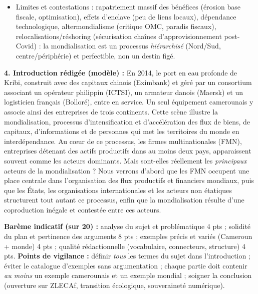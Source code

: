 \documentclass[11pt]{article}
\begin{document}
\begin{corrige}
\begin{itemize}
\begin{itemize}
        \item[b)] Limites et contestations : rapatriement massif des bénéfices (érosion base fiscale, optimisation), effets d'enclave (peu de liens locaux), dépendance technologique, altermondialisme (critique OMC, paradis fiscaux), relocalisations/réshoring (sécurisation chaînes d'approvisionnement post-Covid) : la mondialisation est un processus \emph{hiérarchisé} (Nord/Sud, centre/périphérie) et perfectible, non un destin figé.
    \end{itemize}
\end{itemize}

\textbf{4. Introduction rédigée (modèle) :}
\og En 2014, le port en eau profonde de Kribi, construit avec des capitaux chinois (Eximbank) et géré par un consortium associant un opérateur philippin (ICTSI), un armateur danois (Maersk) et un logisticien français (Bolloré), entre en service. Un seul équipement camerounais y associe ainsi des entreprises de trois continents. Cette scène illustre la mondialisation, processus d'intensification et d'accélération des flux de biens, de capitaux, d'informations et de personnes qui met les territoires du monde en interdépendance. Au cœur de ce processus, les firmes multinationales (FMN), entreprises détenant des actifs productifs dans au moins deux pays, apparaissent souvent comme les acteurs dominants. Mais sont-elles réellement les \emph{principaux} acteurs de la mondialisation ? Nous verrons d'abord que les FMN occupent une place centrale dans l'organisation des flux productifs et financiers mondiaux, puis que les États, les organisations internationales et les acteurs non étatiques structurent tout autant ce processus, enfin que la mondialisation résulte d'une coproduction inégale et contestée entre ces acteurs. \fg

\textbf{Barème indicatif (sur 20) :} analyse du sujet et problématique 4 pts ; solidité du plan et pertinence des arguments 8 pts ; exemples précis et variés (Cameroun + monde) 4 pts ; qualité rédactionnelle (vocabulaire, connecteurs, structure) 4 pts.
\textbf{Points de vigilance :} définir \emph{tous} les termes du sujet dans l'introduction ; éviter le catalogue d'exemples sans argumentation ; chaque partie doit contenir \emph{au moins} un exemple camerounais et un exemple mondial ; soigner la conclusion (ouverture sur ZLECAf, transition écologique, souveraineté numérique).
\end{corrige}
\end{document}
